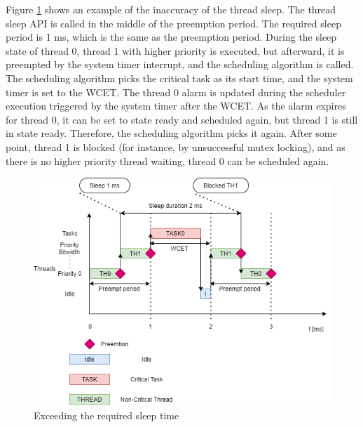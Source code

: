 Figure \ref{fig:threadExceedingSleep} shows an example of the inaccuracy of the thread sleep. The thread sleep \ac{API} is called in the middle of the preemption period. The required sleep period is 1 ms, which is the same as the preemption period. During the sleep state of thread 0, thread 1 with higher priority is executed, but afterward, it is preempted by the system timer interrupt, and the scheduling algorithm is called. The scheduling algorithm picks the critical task as its start time, and the system timer is set to the \ac{WCET}. The thread 0 alarm is updated during the scheduler execution triggered by the system timer after the \ac{WCET}. As the alarm expires for thread 0, it can be set to state ready and scheduled again, but thread 1 is still in state ready. Therefore, the scheduling algorithm picks it again. After some point, thread 1 is blocked (for instance, by unsuccessful mutex locking), and as there is no higher priority thread waiting, thread 0 can be scheduled again.
\begin{figure}[H]
\begin{center}
\includegraphics[width=1\textwidth]{images/thread_sleep_longer.png}
\caption{Exceeding the required sleep time}
\label{fig:threadExceedingSleep}
\end{center}
\end{figure}

